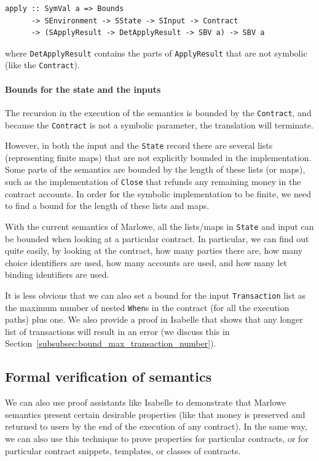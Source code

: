 \documentclass[runningheads]{llncs}
\begin{document}
\begin{verbatim}
apply :: SymVal a => Bounds
      -> SEnvironment -> SState -> SInput -> Contract
      -> (SApplyResult -> DetApplyResult -> SBV a) -> SBV a
\end{verbatim}

\noindent
where \texttt{DetApplyResult} contains the parts of \texttt{ApplyResult} that are not symbolic (like the \texttt{Contract}).

\paragraph{Bounds for the state and the inputs}

The recursion in the execution of the semantics is bounded by the \texttt{Contract}, and because the \texttt{Contract} is not a symbolic parameter, the translation will terminate.

However, in both the input and the \texttt{State} record there are several lists (representing finite maps) that are not explicitly bounded in the implementation. Some parts of the semantics are bounded by the length of these lists (or maps), such as the implementation of \texttt{Close} that refunds any remaining money in the contract accounts.
In order for the symbolic implementation to be finite, we need to find a bound for the length of these lists and maps.

With the current semantics of Marlowe, all the lists/maps in \texttt{State} and input can be bounded when looking at a particular contract. In particular, we can find out quite easily, by looking at the contract, how many parties there are, how many choice identifiers are used, how many accounts are used, and how many let binding identifiers are used.

It is less obvious that we can also set a bound for the input \texttt{Transaction} list as the maximum number of nested \texttt{When}s in the contract (for all the execution paths) plus one. We also provide a proof in Isabelle that shows that any longer list of transactions will result in an error (we discuss this in Section~\ref{subsubsec:bound_max_transaction_number}).

\subsection{Formal verification of semantics\label{subsec:verification}}

We can also use proof assistants like Isabelle to demonstrate that Marlowe semantics present certain desirable properties (like that money is preserved and returned to users by the end of the execution of any contract). In the same way, we can also use this technique to prove properties for particular contracts, or for particular contract snippets, templates, or classes of contracts.
\end{document}

